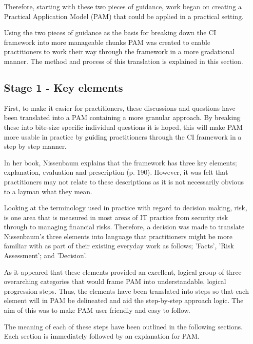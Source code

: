 Therefore, starting with these two pieces of guidance, work began on creating a Practical Application Model (PAM) that could be applied in a practical setting. 

Using the two pieces of guidance as the basis for breaking down the CI framework into more manageable chunks PAM was created to enable practitioners to work their way through the framework in a more gradational manner. The method and process of this translation is explained in this section.

\subsection {Stage 1 - Key elements}

First, to make it easier for practitioners, these discussions and questions have been translated into a PAM containing a more granular approach. By breaking these into bite-size specific individual questions it is hoped, this will make PAM more usable in practice by guiding practitioners through the CI framework in a step by step manner.

In her book, Nissenbaum explains that the framework has three key elements; explanation, evaluation and prescription (p. 190). However, it was felt that practitioners may not relate to these descriptions as it is not necessarily obvious to a layman what they mean. %

Looking at the terminology used in practice with regard to decision making, risk, is one area that is measured in most areas of IT practice from security risk through to managing financial risks. Therefore, a decision was made to translate Nissenbaum's three elements into language that practitioners might be more familiar with as part of their existing everyday work as follows; 'Facts', 'Risk Assessment'; and 'Decision'.  

As it appeared that these elements provided an excellent, %
logical group of three overarching categories that would frame PAM into understandable, logical progression steps. Thus, the elements have been translated into steps so that each element will in PAM be delineated and aid the step-by-step approach logic. The aim of this was to make PAM user friendly and easy to follow. 

The meaning of each of these steps have been outlined in the following sections. Each section is immediately followed by an explanation for PAM.

